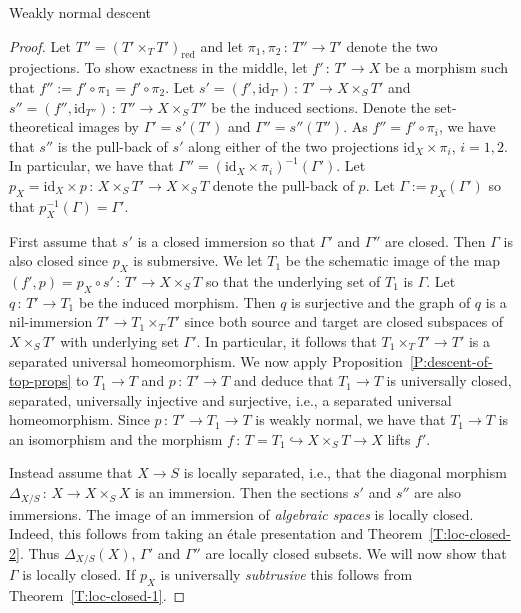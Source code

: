 \documentclass[a4paper,twoside,11pt]{amsart}[2009/07/02] %
\newcommand{\pref}[1]{\eqref{#1}}
\newcommand{\inj}{\hookrightarrow}
\newcommand{\map}[3]{#1\,:\, #2\rightarrow #3}
\newcommand{\etale}{\'{e}tale}
\newcommand{\red}{\mathrm{red}}
\newcommand\id[1]{\mathrm{id}_{#1}}
\begin{document}
\begin{section}{Weakly normal descent}
\begin{proof}
Let $T''=(T'\times_T T')_\red$ and let $\map{\pi_1,\pi_2}{T''}{T'}$ denote the
two projections. To show exactness in the middle, let $\map{f'}{T'}{X}$ be
a morphism such that $f'':=f'\circ \pi_1=f'\circ \pi_2$.
%
%
Let $\map{s'=(f',\id{T'})}{T'}{X\times_S T'}$ and
$\map{s''=(f'',\id{T''})}{T''}{X\times_S T''}$ be the induced sections.
Denote the set-theoretical images by $\Gamma'=s'(T')$ and
$\Gamma''=s''(T'')$. As $f''=f'\circ \pi_i$, we have that $s''$ is the
pull-back of $s'$ along either of the two projections $\id{X}\times\pi_i$,
$i=1,2$. In particular, we have that
$\Gamma''=(\id{X}\times\pi_i)^{-1}(\Gamma')$.
%
Let $\map{p_X=\id{X}\times p}{X\times_S T'}{X\times_S T}$ denote the pull-back
of $p$. Let $\Gamma:=p_X(\Gamma')$ so that $p_X^{-1}(\Gamma)=\Gamma'$.

First assume that $s'$ is a closed immersion so that $\Gamma'$ and $\Gamma''$
are closed. Then $\Gamma$ is also closed since $p_X$ is submersive.
%
We let ${T_1}$ be the schematic image of the map $\map{(f',p)=p_X\circ
s'}{T'}{X\times_S T}$ so that the underlying set of ${T_1}$ is
$\Gamma$.  Let $\map{q}{T'}{{T_1}}$ be the induced morphism. Then $q$
is surjective and the graph of $q$ is a nil-immersion $T'\to
{T_1}\times_T T'$ since both source and target are closed subspaces of
$X\times_S T'$ with underlying set $\Gamma'$. In particular, it follows that
${T_1}\times_T T'\to T'$ is a separated universal homeomorphism.
%
We now apply Proposition~\pref{P:descent-of-top-props} to ${T_1}\to T$
and $\map{p}{T'}{T}$ and deduce that ${T_1}\to T$ is universally
closed, separated, universally injective and surjective, i.e., a separated
universal homeomorphism. Since $\map{p}{T'\to{T_1}}{T}$ is weakly
normal, we have that ${T_1}\to T$ is an isomorphism and the morphism
$\map{f}{T={T_1}\inj X\times_S T}{X}$ lifts $f'$.

Instead assume that $X\to S$ is locally separated, i.e., that the diagonal
morphism $\map{\Delta_{X/S}}{X}{X\times_S X}$ is an immersion. Then the
sections $s'$ and $s''$ are also immersions.
%
The image of an immersion of \emph{algebraic spaces} is locally closed.
Indeed, this follows from taking an \etale{} presentation and
Theorem~\pref{T:loc-closed-2}. Thus $\Delta_{X/S}(X)$, $\Gamma'$ and $\Gamma''$
are locally closed subsets. We will now show that $\Gamma$ is locally
closed. If $p_X$ is universally \emph{subtrusive} this follows from
Theorem~\pref{T:loc-closed-1}.


\end{proof}
\end{section}
\end{document}
